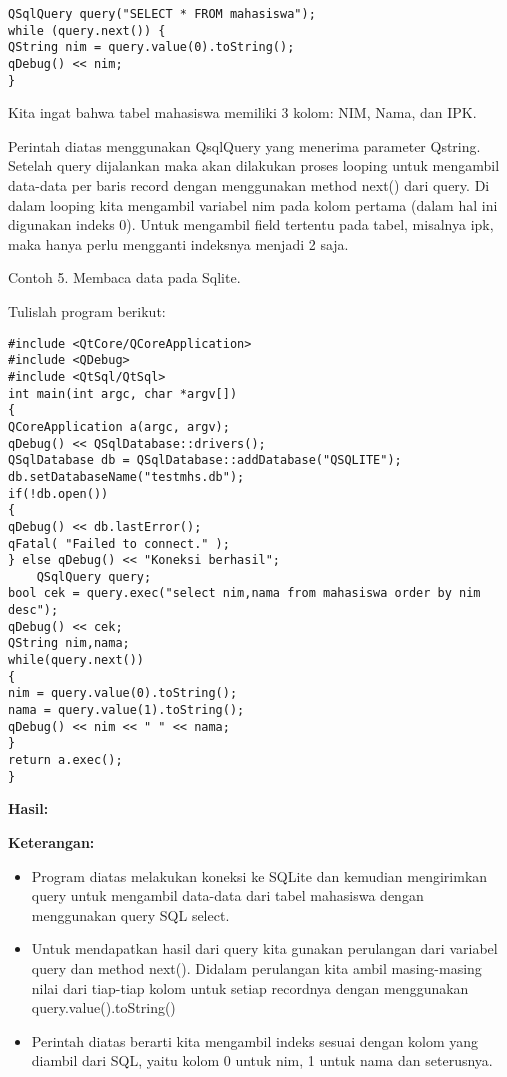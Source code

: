 \begin{verbatim}
QSqlQuery query("SELECT * FROM mahasiswa");
while (query.next()) {
QString nim = query.value(0).toString();
qDebug() << nim;
}
\end{verbatim}

Kita ingat bahwa tabel mahasiswa memiliki 3 kolom: NIM, Nama, dan IPK.

Perintah diatas menggunakan QsqlQuery yang menerima parameter Qstring.
Setelah query dijalankan maka akan dilakukan proses looping untuk
mengambil data-data per baris record dengan menggunakan method next()
dari query. Di dalam looping kita mengambil variabel nim pada kolom
pertama (dalam hal ini digunakan indeks 0). Untuk mengambil field
tertentu pada tabel, misalnya ipk, maka hanya perlu mengganti indeksnya
menjadi 2 saja.

Contoh 5. Membaca data pada Sqlite.

Tulislah program berikut:

\begin{verbatim}
#include <QtCore/QCoreApplication>
#include <QDebug>
#include <QtSql/QtSql>
int main(int argc, char *argv[])
{
QCoreApplication a(argc, argv);
qDebug() << QSqlDatabase::drivers();
QSqlDatabase db = QSqlDatabase::addDatabase("QSQLITE");
db.setDatabaseName("testmhs.db");
if(!db.open())
{
qDebug() << db.lastError();
qFatal( "Failed to connect." );
} else qDebug() << "Koneksi berhasil";
    QSqlQuery query;
bool cek = query.exec("select nim,nama from mahasiswa order by nim desc");
qDebug() << cek;
QString nim,nama;
while(query.next())
{
nim = query.value(0).toString();
nama = query.value(1).toString();
qDebug() << nim << " " << nama;
}
return a.exec();
}
\end{verbatim}

\textbf{Hasil:}

\textbf{Keterangan:}

\begin{itemize}
\tightlist
\item
  Program diatas melakukan koneksi ke SQLite dan kemudian mengirimkan
  query untuk mengambil data-data dari tabel mahasiswa dengan
  menggunakan query SQL select.
\item
  Untuk mendapatkan hasil dari query kita gunakan perulangan dari
  variabel query dan method next(). Didalam perulangan kita ambil
  masing-masing nilai dari tiap-tiap kolom untuk setiap recordnya dengan
  menggunakan query.value().toString()
\item
  Perintah diatas berarti kita mengambil indeks sesuai dengan kolom yang
  diambil dari SQL, yaitu kolom 0 untuk nim, 1 untuk nama dan
  seterusnya.
\end{itemize}

